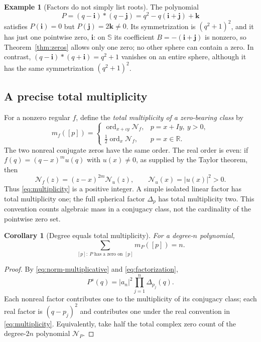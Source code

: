\documentclass[11pt,a4paper]{article}
\numberwithin{equation}{section}
\newtheorem{corollary}[theorem]{Corollary}
\theoremstyle{definition}
\newtheorem{example}[theorem]{Example}
\theoremstyle{remark}
\newcommand{\R}{\mathbb R}
\newcommand{\SSS}{\mathbb S}
\newcommand{\ii}{\mathbf i}
\newcommand{\jj}{\mathbf j}
\newcommand{\kk}{\mathbf k}
\newcommand{\Norm}{\mathcal N}
\newcommand{\ord}{\operatorname{ord}}
\begin{document}
\begin{example}[Factors do not simply list roots]
\label{ex:camshaft}
The polynomial
\[
 P=(q-\ii)*(q-\jj)=q^2-q(\ii+\jj)+\kk
\]
satisfies $P(\ii)=0$ but $P(\jj)=2\kk\ne0$. Its symmetrization is
$(q^2+1)^2$, and it has just one pointwise zero, $\ii$: on $\SSS$ its
coefficient $B=-(\ii+\jj)$ is nonzero, so Theorem~\ref{thm:zeros} allows
only one zero; no other sphere can contain a zero. In contrast,
$(q-\ii)*(q+\ii)=q^2+1$ vanishes on an entire sphere, although it has the
same symmetrization $(q^2+1)^2$.
\end{example}

\subsection{A precise total multiplicity}
For a nonzero regular $f$, define the \emph{total multiplicity of a
zero-bearing class} by
\begin{equation}
 m_f([p])=
 \begin{cases}
 \ord_{x+\iota y}\Norm_f,&p=x+Iy,\ y>0,\\[2pt]
 \tfrac12\ord_x\Norm_f,&p=x\in\R.
 \end{cases}
 \label{eq:multiplicity}
\end{equation}
The two nonreal conjugate zeros have the same order. The real order is even:
if $f(q)=(q-x)^m u(q)$ with $u(x)\ne0$, as supplied by the Taylor theorem,
then
\[
 \Norm_f(z)=(z-x)^{2m}\Norm_u(z),\qquad \Norm_u(x)=|u(x)|^2>0.
\]
Thus \eqref{eq:multiplicity} is a positive integer. A simple isolated linear
factor has total multiplicity one; the full spherical factor $\Delta_p$ has
total multiplicity two. This convention counts algebraic mass in a conjugacy
class, not the cardinality of the pointwise zero set.

\begin{corollary}[Degree equals total multiplicity]
\label{cor:degreecount}
For a degree-$n$ polynomial,
\[
 \sum_{[p]:\ P\text{ has a zero on }[p]}m_P([p])=n.
\]
\end{corollary}
\begin{proof}
By \eqref{eq:norm-multiplicative} and \eqref{eq:factorization},
\[
 P^s(q)=|a_n|^2\prod_{j=1}^n\Delta_{p_j}(q).
\]
Each nonreal factor contributes one to the multiplicity of its conjugacy
class; each real factor is $(q-p_j)^2$ and contributes one under the
real convention in \eqref{eq:multiplicity}. Equivalently, take half the total
complex zero count of the degree-$2n$ polynomial $\Norm_P$.
\end{proof}
\end{document}
